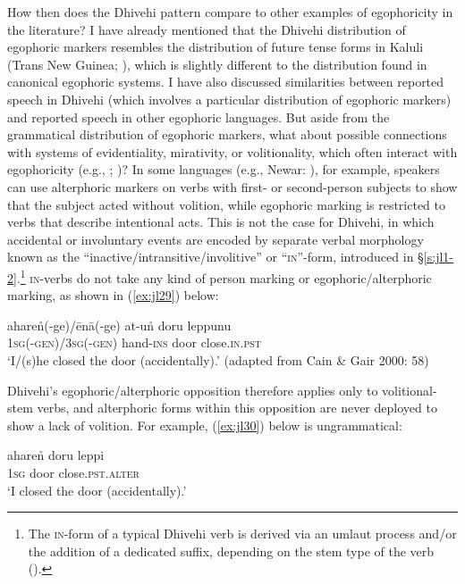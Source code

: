 \documentclass[output=paper]{langsci/langscibook}
\begin{document}
How then does the Dhivehi pattern compare to other examples of egophoricity in the literature? I have already mentioned that the Dhivehi distribution of egophoric markers resembles the distribution of future tense forms in Kaluli (Trans New Guinea; \citealt{SanRoqueSchieffelin2018}), which is slightly different to the distribution found in canonical egophoric systems. I have also discussed similarities between reported speech in Dhivehi (which involves a particular distribution of egophoric markers) and reported speech in other egophoric languages. But aside from the grammatical distribution of egophoric markers, what about possible connections with systems of evidentiality, mirativity, or volitionality, which often interact with egophoricity (e.g., \citealt{Creissels2008}; \citealt{SanRoque2018})? In some languages (e.g., Newar: \citealt{Hale1980}), for example, speakers can use alterphoric markers on verbs with first- or second-person subjects to show that the subject acted without volition, while egophoric marking is restricted to verbs that describe intentional acts. This is not the case for Dhivehi, in which accidental or involuntary events are encoded by separate verbal morphology known as the “inactive/intransitive/involitive” or “\textsc{in}”-form, introduced in §‎\ref{s:jl1-2}.\footnote{The \textsc{in}-form of a typical Dhivehi verb is derived via an umlaut process and/or the addition of a dedicated suffix, depending on the stem type of the verb (\citealt[57–61]{CainGair2000}).} 
\textsc{in}-verbs do not take any kind of person marking or egophoric/alterphoric marking, as shown in (\ref{ex:jl29}) below:

\begin{exe}
	\ex 	\label{ex:jl29}
	\gll aharen̊(‑ge)/ēnā(‑ge) at-un̊ doru leppunu\\
	1\textsc{sg}(-\textsc{gen})/3\textsc{sg}(-\textsc{gen}) hand-\textsc{ins} door close.\textsc{in}.\textsc{pst}\\
	\trans ‘I/(s)he closed the door (accidentally).’ (adapted from Cain \& Gair 2000: 58)
\end{exe}

Dhivehi’s egophoric/alterphoric opposition therefore applies only to volitional-stem verbs, and alterphoric forms within this opposition are never deployed to show a lack of volition. For example, (\ref{ex:jl30}) below is ungrammatical:

\begin{exe}
	\ex 	\label{ex:jl30}
	\gll *aharen̊ doru leppi\\
	1\textsc{sg} door close.\textsc{pst}.\textsc{alter}\\
	\trans ‘I closed the door (accidentally).’
\end{exe}
\end{document}
